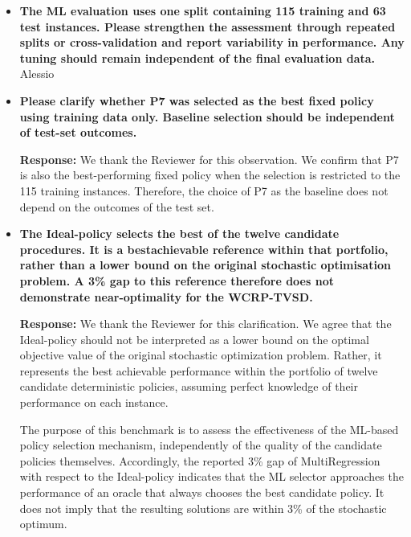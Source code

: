 \documentclass[11pt]{article}
\begin{document}
\begin{enumerate}
\begin{itemize}
We would nevertheless like to emphasize that the reported comparison remains informative, as it measures the difference between the objective values of the solutions actually obtained by the stochastic and expected-value approaches. Moreover, the subsequent policy-selection experiments are restricted to instances for which the stochastic model was solved to optimality or near-optimality, with an optimality gap not exceeding 0.001, thereby limiting the effect of incomplete optimization on the reference values used in that analysis.



\item \textbf{The ML evaluation uses one split containing 115 training and 63 test instances. Please
strengthen the assessment through repeated splits or cross-validation and report
variability in performance. Any tuning should remain independent of the final evaluation
data.}\\

Alessio

\item \textbf{Please clarify whether P7 was selected as the best fixed policy using training data only.
Baseline selection should be independent of test-set outcomes.}


\noindent\textbf{Response:} We thank the Reviewer for this observation. We confirm that P7 is also the best-performing fixed policy when the selection is restricted to the 115 training instances. Therefore, the choice of P7 as the baseline does not depend on the outcomes of the test set.



\item \textbf{The Ideal-policy selects the best of the twelve candidate procedures. It is a bestachievable
reference within that portfolio, rather than a lower bound on the original stochastic optimisation problem. A 3\% gap to this reference therefore does not
demonstrate near-optimality for the WCRP-TVSD.}



\noindent\textbf{Response:} We thank the Reviewer for this clarification. We agree that the Ideal-policy should not be interpreted as a lower bound on the optimal objective value of the original stochastic optimization problem. Rather, it represents the best achievable performance within the portfolio of twelve candidate deterministic policies, assuming perfect knowledge of their performance on each instance.

The purpose of this benchmark is to assess the effectiveness of the ML-based policy selection mechanism, independently of the quality of the candidate policies themselves. Accordingly, the reported 3\% gap of MultiRegression with respect to the Ideal-policy indicates that the ML selector approaches the performance of an oracle that always chooses the best candidate policy. It does not imply that the resulting solutions are within 3\% of the stochastic optimum.


\end{itemize}
\end{enumerate}
\end{document}
